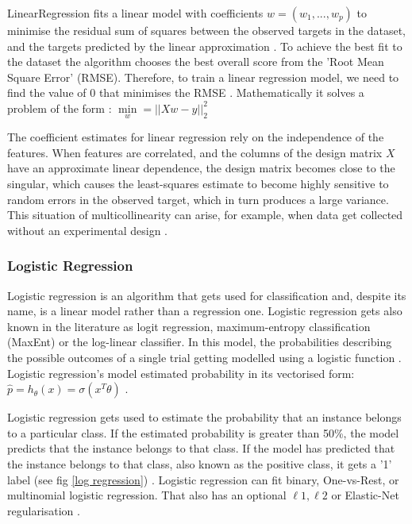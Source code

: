 	LinearRegression fits a linear model with coefficients $w=(w_1,...,w_p)$ to minimise the residual sum of squares between the observed targets in the dataset, and the targets predicted by the linear approximation \cite{sklearn_lr}. To achieve the best fit to the dataset the algorithm chooses the best overall score from the 'Root Mean Square Error' (RMSE). Therefore, to train a linear regression model, we need to find the value of $0$ that minimises the RMSE \cite{geron2019hands}.
	Mathematically it solves a problem of the form \cite{sklearn_lr}:
	$\min\limits_{w} = ||Xw-y||^2_2$
	
	The coefficient estimates for linear regression rely on the independence of the features. When features are correlated, and the columns of the design matrix $X$ have an approximate linear dependence, the design matrix becomes close to the singular, which causes the least-squares estimate to become highly sensitive to random errors in the observed target, which in turn produces a large variance. This situation of multicollinearity can arise, for example, when data get collected without an experimental design \cite{sklearn_lr, geron2019hands}.
	
	\subsubsection{Logistic Regression}
	Logistic regression is an algorithm that gets used for classification and, despite its name, is a linear model rather than a regression one. Logistic regression gets also known in the literature as logit regression, maximum-entropy classification (MaxEnt) or the log-linear classifier. In this model, the probabilities describing the possible outcomes of a single trial getting modelled using a logistic function \cite{sklearn_lr, handson_book}. Logistic regression's model estimated probability in its vectorised form: $\hat{p}=h_\theta(x) = \sigma(x^T\theta)$ \cite{geron2019hands}.
	
	Logistic regression gets used to estimate the probability that an instance belongs to a particular class. If the estimated probability is greater than 50\%, the model predicts that the instance belongs to that class. If the model has predicted that the instance belongs to that class, also known as the positive class, it gets a '1' label  (see fig \ref{log regression}) \cite{handson_book, geron2019hands}. Logistic regression can fit binary, One-vs-Rest, or multinomial logistic regression. That also has an optional $\ell1, \ell2$ or Elastic-Net regularisation \cite{sklearn_lr}.
	
